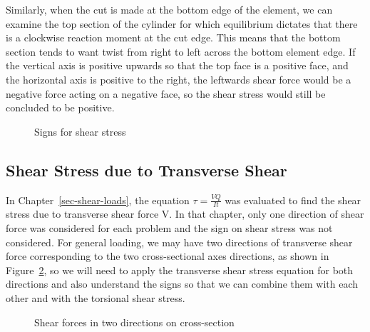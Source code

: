 \documentclass[
  letterpaper,
  DIV=11,
  numbers=noendperiod]{scrreprt}
\theoremstyle{definition}
\theoremstyle{remark}
\begin{document}
Similarly, when the cut is made at the bottom edge of the element, we
can examine the top section of the cylinder for which equilibrium
dictates that there is a clockwise reaction moment at the cut edge. This
means that the bottom section tends to want twist from right to left
across the bottom element edge. If the vertical axis is positive upwards
so that the top face is a positive face, and the horizontal axis is
positive to the right, the leftwards shear force would be a negative
force acting on a negative face, so the shear stress would still be
concluded to be positive.

\begin{figure}


\caption{\label{fig-14.7}Signs for shear stress}

\end{figure}%

\subsection{Shear Stress due to Transverse Shear}\label{sec-14.2.2}

In Chapter~\ref{sec-shear-loads}, the equation \(\tau=\frac{V Q}{I t}\)
was evaluated to find the shear stress due to transverse shear force V.
In that chapter, only one direction of shear force was considered for
each problem and the sign on shear stress was not considered. For
general loading, we may have two directions of transverse shear force
corresponding to the two cross-sectional axes directions, as shown in
Figure~\ref{fig-14.8}, so we will need to apply the transverse shear
stress equation for both directions and also understand the signs so
that we can combine them with each other and with the torsional shear
stress.

\begin{figure}


\caption{\label{fig-14.8}Shear forces in two directions on
cross-section}

\end{figure}%
\end{document}
